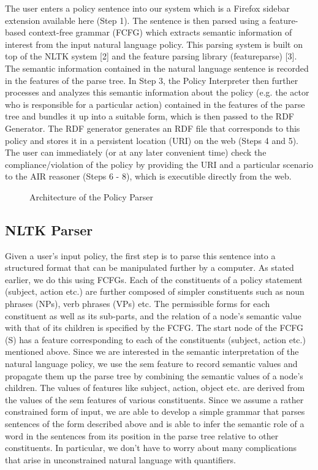 \documentclass{llncs}
\begin{document}
The user enters a policy sentence into our system which is a Firefox sidebar extension available here (Step 1). The sentence is then parsed using a feature-based context-free grammar (FCFG) which extracts semantic information of interest from the input natural language policy. This parsing system is built on top of the NLTK system [2] and the feature parsing library (featureparse) [3]. The semantic information contained in the natural language sentence is recorded in the features of the parse tree. In Step 3, the Policy Interpreter then further processes and analyzes this semantic information about the policy (e.g. the actor who is responsible for a particular action) contained in the features of the parse tree and bundles it up into a suitable form, which is then passed to the RDF Generator. The RDF generator generates an RDF file that corresponds to this policy and stores it in a persistent location (URI) on the web (Steps 4 and 5). The user can immediately (or at any later convenient time) check the compliance/violation of the policy by providing the URI and a particular scenario to the AIR reasoner (Steps 6 - 8), which is executible directly from the web.

\begin{figure}[!h]
  \centerline{}
  \caption{Architecture of the Policy Parser}
  \label{fig-architecture}
\end{figure}


\subsection{NLTK Parser}

Given a user's input policy, the first step is to parse this sentence into a structured format that can be manipulated further by a computer. As stated earlier, we do this using FCFGs. Each of the constituents of a policy statement (subject, action etc.) are further composed of simpler constituents such as noun phrases (NPs), verb phrases (VPs) etc. The permissible forms for each constituent as well as its sub-parts, and the relation of a node's semantic value with that of its children is specified by the FCFG. The start node of the FCFG (S) has a feature corresponding to each of the constituents (subject, action etc.) mentioned above. Since we are interested in the semantic interpretation of the natural language policy, we use the sem feature to record semantic values and propagate them up the parse tree by combining the semantic values of a node's children. The values of features like subject, action, object etc. are derived from the values of the sem features of various constituents. Since we assume a rather constrained form of input, we are able to develop a simple grammar that parses sentences of the form described above and is able to infer the semantic role of a word in the sentences from its position in the parse tree relative to other constituents. In particular, we don't have to worry about many complications that arise in unconstrained natural language with quantifiers.
\end{document}
